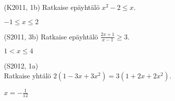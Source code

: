 \begin{tehtava}
(K2011, 1b) Ratkaise epäyhtälö $x^2-2 \leq x$.
\begin{vastaus}
$-1 \leq x \leq 2$
\end{vastaus}
\end{tehtava}

\begin{tehtava}
  (S2011, 3b) Ratkaise epäyhtälö $\frac{2x+1}{x-1} \geq 3$.
\begin{vastaus}
$1<x \leq 4$
\end{vastaus}
\end{tehtava}

\begin{tehtava}
(S2012, 1a) \\ Ratkaise yhtälö $2(1-3x+3x^2) = 3(1+2x+2x^2)$.
\begin{vastaus}
$x=-\frac{1}{12}$
\end{vastaus}
\end{tehtava}


  

  

